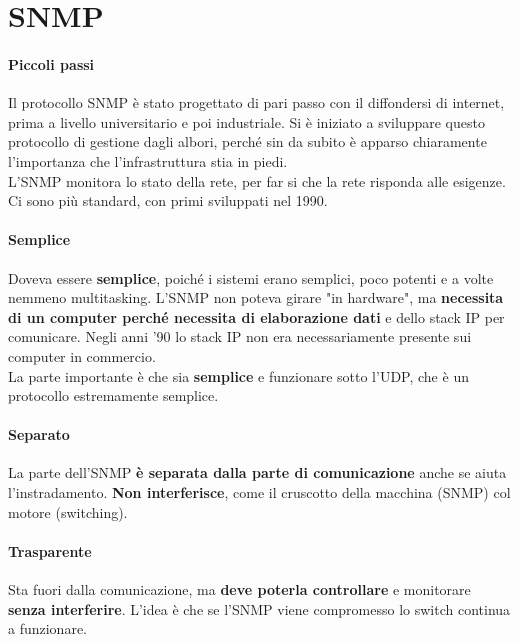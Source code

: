 \documentclass[10pt]{book}
\begin{document}
\section{SNMP}
\paragraph{Piccoli passi} Il protocollo SNMP è stato progettato di pari passo con il diffondersi di internet, prima a livello universitario e poi industriale. Si è iniziato a sviluppare questo protocollo di gestione dagli albori, perché sin da subito è apparso chiaramente l'importanza che l'infrastruttura stia in piedi.\\
L'SNMP monitora lo stato della rete, per far si che la rete risponda alle esigenze. Ci sono più standard, con primi sviluppati nel 1990.
\paragraph{Semplice} Doveva essere \textbf{semplice}, poiché i sistemi erano semplici, poco potenti e a volte nemmeno multitasking. L'SNMP non poteva girare "in hardware", ma \textbf{necessita di un computer perché necessita di elaborazione dati} e dello stack IP per comunicare. Negli anni '90 lo stack IP non era necessariamente presente sui computer in commercio.\\
La parte importante è che sia \textbf{semplice} e funzionare sotto l'UDP, che è un protocollo estremamente semplice.
\paragraph{Separato} La parte dell'SNMP \textbf{è separata dalla parte di comunicazione} anche se aiuta l'instradamento. \textbf{Non interferisce}, come il cruscotto della macchina (SNMP) col motore (switching).
\paragraph{Trasparente} Sta fuori dalla comunicazione, ma \textbf{deve poterla controllare} e monitorare \textbf{senza interferire}. L'idea è che se l'SNMP viene compromesso lo switch continua a funzionare.
\end{document}
